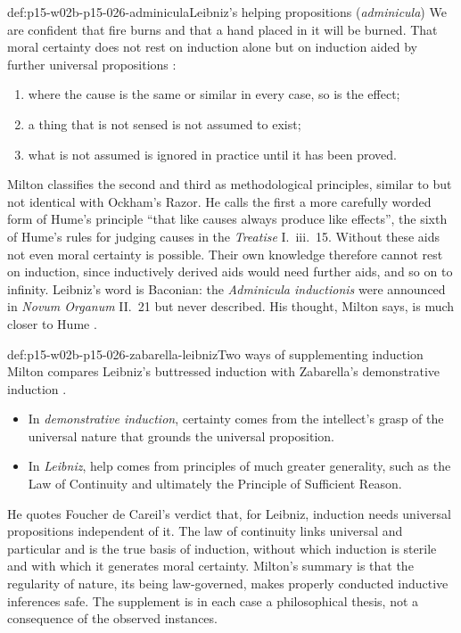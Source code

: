 \begin{hbdefinition}{def:p15-w02b-p15-026-adminicula}{Leibniz's helping propositions (\emph{adminicula})}
We are confident that fire burns and that a hand placed in it will be
burned. That moral certainty does not rest on induction alone but on
induction aided by further universal propositions
\cite[p.~35]{Milton2011InductionBeforeHume}:
\begin{enumerate}
\item where the cause is the same or similar in every case, so is the
  effect;
\item a thing that is not sensed is not assumed to exist;
\item what is not assumed is ignored in practice until it has been
  proved.
\end{enumerate}
\end{hbdefinition}

Milton classifies the second and third as methodological principles,
similar to but not identical with Ockham's Razor. He calls the first a more
carefully worded form of Hume's principle ``that like causes always produce
like effects'', the sixth of Hume's rules for judging causes in the
\emph{Treatise} I.~iii.~15. Without these aids not even moral certainty is
possible. Their own knowledge therefore cannot rest on induction, since
inductively derived aids would need further aids, and so on to infinity.
Leibniz's word is Baconian: the \emph{Adminicula inductionis} were announced
in \emph{Novum Organum} II.~21 but never described. His thought, Milton
says, is much closer to Hume
\cite[p.~35, nn.~22--24]{Milton2011InductionBeforeHume}.

\begin{hbwarning}{def:p15-w02b-p15-026-zabarella-leibniz}{Two ways of supplementing induction}
Milton compares Leibniz's buttressed induction with Zabarella's
demonstrative induction \cite[p.~36]{Milton2011InductionBeforeHume}.
\begin{itemize}
\item In \emph{demonstrative induction}, certainty comes from the
  intellect's grasp of the universal nature that grounds the universal
  proposition.
\item In \emph{Leibniz}, help comes from principles of much greater
  generality, such as the Law of Continuity and ultimately the Principle of
  Sufficient Reason.
\end{itemize}
He quotes Foucher de Careil's verdict that, for Leibniz, induction needs
universal propositions independent of it. The law of continuity links
universal and particular and is the true basis of induction, without which
induction is sterile and with which it generates moral certainty. Milton's
summary is that the regularity of nature, its being law-governed, makes
properly conducted inductive inferences safe. The supplement is in each
case a philosophical thesis, not a consequence of the observed instances.
\end{hbwarning}

